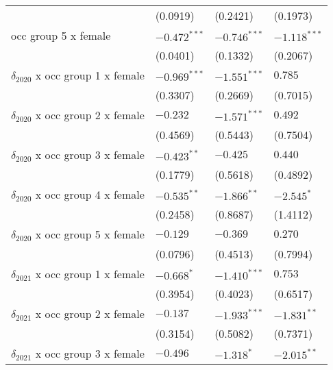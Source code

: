\begin{tabular}{llll}
                                       &           (0.0919) &           (0.2421) &           (0.1973) \\
occ group 5 x female                   &     $-0.472^{***}$ &     $-0.746^{***}$ &     $-1.118^{***}$ \\
                                       &           (0.0401) &           (0.1332) &           (0.2067) \\
$\delta_{2020}$ x occ group 1 x female &     $-0.969^{***}$ &     $-1.551^{***}$ &            $0.785$ \\
                                       &           (0.3307) &           (0.2669) &           (0.7015) \\
$\delta_{2020}$ x occ group 2 x female &           $-0.232$ &     $-1.571^{***}$ &            $0.492$ \\
                                       &           (0.4569) &           (0.5443) &           (0.7504) \\
$\delta_{2020}$ x occ group 3 x female &      $-0.423^{**}$ &           $-0.425$ &            $0.440$ \\
                                       &           (0.1779) &           (0.5618) &           (0.4892) \\
$\delta_{2020}$ x occ group 4 x female &      $-0.535^{**}$ &      $-1.866^{**}$ &         $-2.545^*$ \\
                                       &           (0.2458) &           (0.8687) &           (1.4112) \\
$\delta_{2020}$ x occ group 5 x female &           $-0.129$ &           $-0.369$ &            $0.270$ \\
                                       &           (0.0796) &           (0.4513) &           (0.7994) \\
$\delta_{2021}$ x occ group 1 x female &         $-0.668^*$ &     $-1.410^{***}$ &            $0.753$ \\
                                       &           (0.3954) &           (0.4023) &           (0.6517) \\
$\delta_{2021}$ x occ group 2 x female &           $-0.137$ &     $-1.933^{***}$ &      $-1.831^{**}$ \\
                                       &           (0.3154) &           (0.5082) &           (0.7371) \\
$\delta_{2021}$ x occ group 3 x female &           $-0.496$ &         $-1.318^*$ &      $-2.015^{**}$ \\

\end{tabular}
